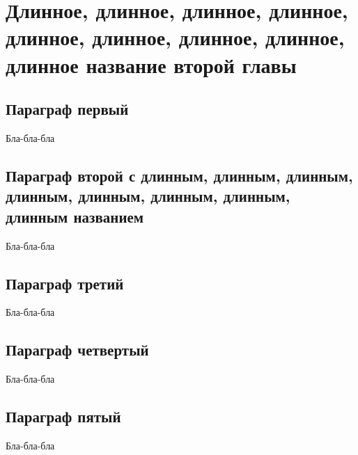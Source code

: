 \chapter{Длинное, длинное, длинное, длинное, длинное, длинное, длинное, длинное, длинное название второй главы} \label{chapt2}

\section{Параграф первый} \label{sect2_0}

Бла-бла-бла


\section{Параграф второй с длинным, длинным, длинным, длинным, длинным, длинным, длинным, длинным названием} \label{sect2_1}
Бла-бла-бла


\section{Параграф третий} \label{sect2_1_experiment}
Бла-бла-бла


\section{Параграф четвертый} \label{sect2_2}
Бла-бла-бла

\section{Параграф пятый} \label{sect2_3}
Бла-бла-бла
